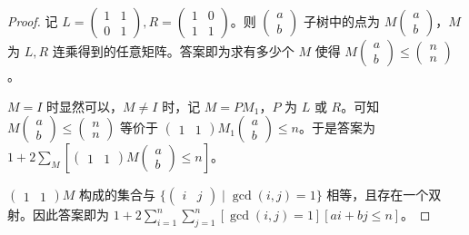 \documentclass[../main.tex]{subfiles}
\begin{document}
\begin{frame}
\begin{proof}
记 $L=\begin{pmatrix}1 & 1\\0 & 1\end{pmatrix},R=\begin{pmatrix}1 & 0\\1 & 1\end{pmatrix}$。则 $\begin{pmatrix}a\\b\end{pmatrix}$ 子树中的点为 $M\begin{pmatrix}a\\b\end{pmatrix}$，$M$ 为 $L,R$ 连乘得到的任意矩阵。答案即为求有多少个 $M$ 使得 $M\begin{pmatrix}a\\b\end{pmatrix}\le\begin{pmatrix}n\\n\end{pmatrix}$。\pause

$M=I$ 时显然可以，$M\neq I$ 时，记 $M=PM_1$，$P$ 为 $L$ 或 $R$。可知 $M\begin{pmatrix}a\\b\end{pmatrix}\le\begin{pmatrix}n\\n\end{pmatrix}$ 等价于 $\begin{pmatrix}1 & 1\end{pmatrix}M_1\begin{pmatrix}a\\b\end{pmatrix}\le n$。于是答案为 $1+2\sum\limits_{M}[\begin{pmatrix}1 & 1\end{pmatrix}M\begin{pmatrix}a\\b\end{pmatrix}\le n]$。\pause

$\begin{pmatrix}1 & 1\end{pmatrix}M$ 构成的集合与 $\{\begin{pmatrix}i & j\end{pmatrix}\mid \gcd(i,j)=1\}$ 相等，且存在一个双射。因此答案即为 $1+2\sum\limits_{i=1}^n\sum\limits_{j=1}^n[\gcd(i,j)=1][ai+bj\le n]$。
\end{proof}
\end{frame}
\end{document}

